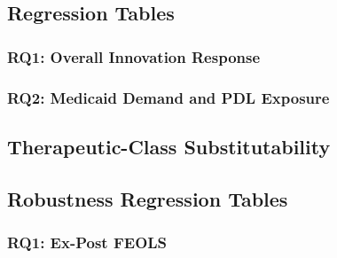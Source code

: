 \documentclass[12pt]{article}
\begin{document}
\clearpage


\renewenvironment{table}[1][]{}{}

\subsection{Regression Tables}

\subsubsection{RQ1: Overall Innovation Response}

\footnotesize

\label{tab:rq1_feols_exante}
\normalsize

\clearpage

\subsubsection{RQ2: Medicaid Demand and PDL Exposure}

\footnotesize

\label{tab:rq2_feols_exante}
\normalsize

\clearpage

\subsection{Therapeutic-Class Substitutability}

\makeatletter
\renewenvironment{table}[1][H]{\@float{table}[H]}{\end@float}
\makeatother

\renewenvironment{table}[1][]{}{}

\clearpage


\subsection{Robustness Regression Tables}

\subsubsection{RQ1: Ex-Post FEOLS}
\end{document}
